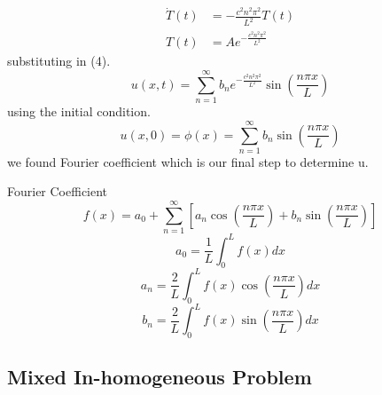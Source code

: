 \documentclass[]{article}
\begin{document}
\begin{align*}
\dot{T}(t) &= -\frac{c^2 n^2 \pi^2}{L^2} T(t)
\\
T(t) &= Ae^{-\frac{c^2 n^2 \pi^2}{L^2}}
\end{align*}
substituting in (4).
\[
    u(x,t) = \sum_{n=1}^{\infty} b_n e^{-\frac{c^2 n^2 \pi^2}{L^2}}\sin\left(\frac{n\pi x}{L}\right)    
\]
using the initial condition.
\[
    u(x,0) = \phi(x) = \sum_{n=1}^{\infty} b_n \sin\left(\frac{n\pi x}{L}\right)    
\]
we found Fourier coefficient which is our final step to determine u.
\begin{enrichment*}{Fourier Coefficient}
    \[
        f(x) = a_0  + \sum_{n=1}^{\infty}\left[a_n \cos\left(\frac{n\pi x}{L}\right) + b_n \sin\left(\frac{n\pi x}{L}\right) \right]
    \]
    \[
        a_0 = \frac{1}{L}\int_{0}^{L}f(x)dx
    \]
    \[
        a_n = \frac{2}{L}\int_{0}^{L}f(x)\cos\left(\frac{n\pi x}{L}\right)dx
    \]
    \[
        b_n = \frac{2}{L}\int_{0}^{L}f(x)\sin\left(\frac{n\pi x}{L}\right)dx
    \]
\end{enrichment*}

\newpage

\setcounter{equation}{0}
\subsection{Mixed In-homogeneous Problem}
\end{document}
